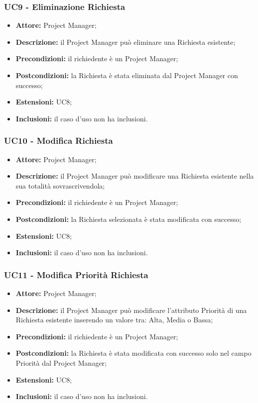 \subsubsection*{UC9 - Eliminazione Richiesta}
\begin{itemize}[label=$\circ$]
\item \textbf{Attore:} Project Manager;
\item \textbf{Descrizione:} il Project Manager può eliminare una Richiesta esistente;
\item \textbf{Precondizioni:} il richiedente è un Project Manager;
\item \textbf{Postcondizioni:} la Richiesta è stata eliminata dal Project Manager con successo;
\item \textbf{Estensioni:} UC8;
\item \textbf{Inclusioni:} il caso d'uso non ha inclusioni.
\end{itemize}

\subsubsection*{UC10 - Modifica Richiesta}
\begin{itemize}[label=$\circ$]
\item \textbf{Attore:} Project Manager;
\item \textbf{Descrizione:} il Project Manager può modificare una Richiesta esistente nella sua totalità sovrascrivendola;
\item \textbf{Precondizioni:} il richiedente è un Project Manager;
\item \textbf{Postcondizioni:} la Richiesta selezionata è stata modificata con successo;
\item \textbf{Estensioni:} UC8;
\item \textbf{Inclusioni:} il caso d'uso non ha inclusioni.
\end{itemize}

\subsubsection*{UC11 - Modifica Priorità Richiesta}
\begin{itemize}[label=$\circ$]
\item \textbf{Attore:} Project Manager;
\item \textbf{Descrizione:} il Project Manager può modificare l'attributo Priorità di una Richiesta esistente inserendo un valore tra: Alta, Media o Bassa;
\item \textbf{Precondizioni:} il richiedente è un Project Manager;
\item \textbf{Postcondizioni:} la Richiesta è stata modificata con successo solo nel campo Priorità dal Project Manager;
\item \textbf{Estensioni:} UC8;
\item \textbf{Inclusioni:} il caso d'uso non ha inclusioni.
\end{itemize}

